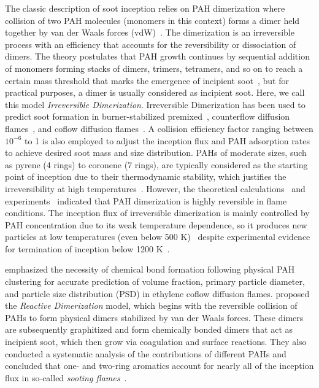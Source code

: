 The classic description of soot inception relies on PAH dimerization where collision of two PAH molecules (monomers in this context) forms a dimer held together by van der Waals forces (vdW)~\citep{frenklach1991detailed}. The dimerization is an irreversible process with an efficiency that accounts for the reversibility or dissociation of dimers. The theory postulates that PAH growth continues by sequential addition of monomers forming stacks of dimers, trimers, tetramers, and so on to reach a certain mass threshold that marks the emergence of incipient soot~\citep{frenklach1991detailed}, but for practical purposes, a dimer is usually considered as incipient soot. Here, we call this model \textit{Irreversible Dimerization}. 
Irreversible Dimerization has been used to predict soot formation in burner-stabilized premixed~\citep{salenbauch2015modeling, desgroux2017comparative}, counterflow diffusion flames~\citep{wang2015soot, xu2021experimental}, and coflow diffusion flames~\citep{kholghy2016core, veshkini2016understanding}. A collision efficiency factor ranging between $10^{-6}$ to 1 is also employed to adjust the inception flux and PAH adsorption rates to achieve desired soot mass and size distribution. PAHs of moderate sizes, such as pyrene (4 rings) to coronene (7 rings), are typically considered as the starting point of inception due to their thermodynamic stability, which justifies the irreversibility at high temperatures~\citep{frenklach1991detailed}. However, the theoretical calculations~\citep{miller1985calculations} and experiments~\citep{sabbah2010exploring} indicated that PAH dimerization is highly reversible in flame conditions. The inception flux of irreversible dimerization is mainly controlled by PAH concentration due to its weak temperature dependence, so it produces new particles at low temperatures (even below 500 K)~\citep{naseri2022simulating} despite experimental evidence for termination of inception below 1200 K~\citep{sanchez2012polycyclic, cho2016synthesis}. 



\citet{kholghy2019role} emphasized the necessity of chemical bond formation following physical PAH clustering for accurate prediction of volume fraction, primary particle diameter, and particle size distribution (PSD) in ethylene coflow diffusion flames. \citet{kholghy2018reactive} proposed the \textit{Reactive Dimerization} model, which begins with the reversible collision of PAHs to form physical dimers stabilized by van der Waals forces. These dimers are subsequently graphitized and form chemically bonded dimers that act as incipient soot, which then grow via coagulation and surface reactions. They also conducted a systematic analysis of the contributions of different PAHs and concluded that one- and two-ring aromatics account for nearly all of the inception flux in so-called \textit{sooting flames}~\citep{desgroux2017comparative}. 

